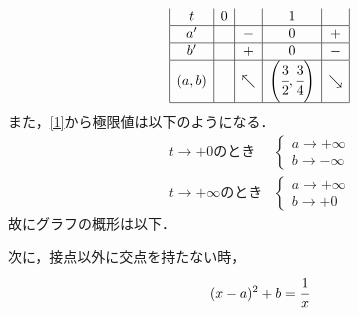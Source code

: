 \documentclass[a4j]{jarticle}
\begin{document}
\begin{multicols}{2}
\begin{align*}
\begin{array}{|c|c|c|c|c|}
         t       & 0 &     &1                                                  &      \\ \hline
         a'     &    &-    &0                                                  &+    \\ \hline
         b'     &    &+   &                                                  0&-     \\ \hline
         (a,b)&    &\nwarrow&\left(\cfrac{3}{2},\cfrac{3}{4}\right)&\searrow \\ \hline
         \end{array}
     \end{align*}
また，\eqref{1}から極限値は以下のようになる．
     \begin{align*}
     t\to+0\text{のとき}&\left\{
          \begin{array}{l}
          a\to+\infty \\
          b\to-\infty 
          \end{array}
     \right. \\
     t\to+\infty\text{のとき}&\left\{
          \begin{array}{l}
          a\to+\infty \\
          b\to+0 
          \end{array}
     \right.
     \end{align*}
故にグラフの概形は以下．
     \begin{center}  
      \end{center}
次に，接点以外に交点を持たない時，
    \begin{align*}
    (x-a)^2+b=\cfrac{1}{x} 
    \end{align*}

\end{multicols}
\end{document}
